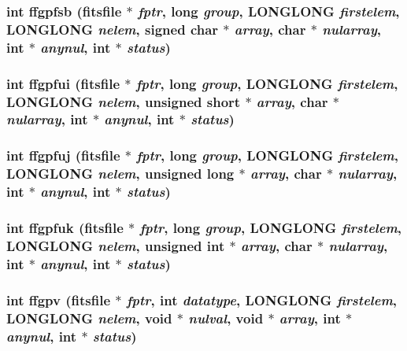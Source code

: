 \subsubsection{\setlength{\rightskip}{0pt plus 5cm}int ffgpfsb (\bf{fitsfile} $\ast$ {\em fptr}, long {\em group}, \bf{LONGLONG} {\em firstelem}, \bf{LONGLONG} {\em nelem}, signed char $\ast$ {\em array}, char $\ast$ {\em nularray}, int $\ast$ {\em anynul}, int $\ast$ {\em status})}\label{src_2fitsio_8h_d9472db2fdb501fccf5c65359329a9d6}


\subsubsection{\setlength{\rightskip}{0pt plus 5cm}int ffgpfui (\bf{fitsfile} $\ast$ {\em fptr}, long {\em group}, \bf{LONGLONG} {\em firstelem}, \bf{LONGLONG} {\em nelem}, unsigned short $\ast$ {\em array}, char $\ast$ {\em nularray}, int $\ast$ {\em anynul}, int $\ast$ {\em status})}\label{src_2fitsio_8h_37540a1aeebbe1a4d6a20df96204a615}


\subsubsection{\setlength{\rightskip}{0pt plus 5cm}int ffgpfuj (\bf{fitsfile} $\ast$ {\em fptr}, long {\em group}, \bf{LONGLONG} {\em firstelem}, \bf{LONGLONG} {\em nelem}, unsigned long $\ast$ {\em array}, char $\ast$ {\em nularray}, int $\ast$ {\em anynul}, int $\ast$ {\em status})}\label{src_2fitsio_8h_45489521b50ea72a1b13a57a1bdc6180}


\subsubsection{\setlength{\rightskip}{0pt plus 5cm}int ffgpfuk (\bf{fitsfile} $\ast$ {\em fptr}, long {\em group}, \bf{LONGLONG} {\em firstelem}, \bf{LONGLONG} {\em nelem}, unsigned int $\ast$ {\em array}, char $\ast$ {\em nularray}, int $\ast$ {\em anynul}, int $\ast$ {\em status})}\label{src_2fitsio_8h_e184edd1d62907a447c3bce7618b8c57}


\subsubsection{\setlength{\rightskip}{0pt plus 5cm}int ffgpv (\bf{fitsfile} $\ast$ {\em fptr}, int {\em datatype}, \bf{LONGLONG} {\em firstelem}, \bf{LONGLONG} {\em nelem}, void $\ast$ {\em nulval}, void $\ast$ {\em array}, int $\ast$ {\em anynul}, int $\ast$ {\em status})}\label{src_2fitsio_8h_0c3f5323e0fb6305fff345b94fb767e7}


